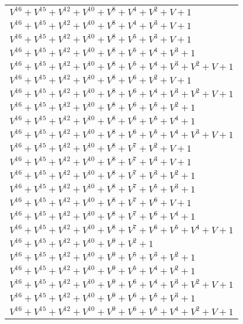 \documentclass[12pt]{article}
\begin{document}
\begin{adjustwidth}{-4cm}{}
\begin{center}
\begin{longtable}{|l|}
$V^{16}  +V^{15}  +V^{12}  +V^{10}  +V^{8}  +V^{4}  +V^{2}  + V + 1$ \\
$V^{16}  +V^{15}  +V^{12}  +V^{10}  +V^{8}  +V^{4}  +V^{3}  + V + 1$ \\
$V^{16}  +V^{15}  +V^{12}  +V^{10}  +V^{8}  +V^{5}  +V^{3}  + V + 1$ \\
$V^{16}  +V^{15}  +V^{12}  +V^{10}  +V^{8}  +V^{5}  +V^{4}  +V^{3}  + 1$ \\
$V^{16}  +V^{15}  +V^{12}  +V^{10}  +V^{8}  +V^{5}  +V^{4}  +V^{3}  +V^{2}  + V + 1$ \\
$V^{16}  +V^{15}  +V^{12}  +V^{10}  +V^{8}  +V^{6}  +V^{2}  + V + 1$ \\
$V^{16}  +V^{15}  +V^{12}  +V^{10}  +V^{8}  +V^{6}  +V^{4}  +V^{3}  +V^{2}  + V + 1$ \\
$V^{16}  +V^{15}  +V^{12}  +V^{10}  +V^{8}  +V^{6}  +V^{5}  +V^{2}  + 1$ \\
$V^{16}  +V^{15}  +V^{12}  +V^{10}  +V^{8}  +V^{6}  +V^{5}  +V^{4}  + 1$ \\
$V^{16}  +V^{15}  +V^{12}  +V^{10}  +V^{8}  +V^{6}  +V^{5}  +V^{4}  +V^{3}  + V + 1$ \\
$V^{16}  +V^{15}  +V^{12}  +V^{10}  +V^{8}  +V^{7}  +V^{2}  + V + 1$ \\
$V^{16}  +V^{15}  +V^{12}  +V^{10}  +V^{8}  +V^{7}  +V^{3}  + V + 1$ \\
$V^{16}  +V^{15}  +V^{12}  +V^{10}  +V^{8}  +V^{7}  +V^{3}  +V^{2}  + 1$ \\
$V^{16}  +V^{15}  +V^{12}  +V^{10}  +V^{8}  +V^{7}  +V^{5}  +V^{3}  + 1$ \\
$V^{16}  +V^{15}  +V^{12}  +V^{10}  +V^{8}  +V^{7}  +V^{6}  + V + 1$ \\
$V^{16}  +V^{15}  +V^{12}  +V^{10}  +V^{8}  +V^{7}  +V^{6}  +V^{4}  + 1$ \\
$V^{16}  +V^{15}  +V^{12}  +V^{10}  +V^{8}  +V^{7}  +V^{6}  +V^{5}  +V^{4}  + V + 1$ \\
$V^{16}  +V^{15}  +V^{12}  +V^{10}  +V^{9}  +V^{2}  + 1$ \\
$V^{16}  +V^{15}  +V^{12}  +V^{10}  +V^{9}  +V^{5}  +V^{3}  +V^{2}  + 1$ \\
$V^{16}  +V^{15}  +V^{12}  +V^{10}  +V^{9}  +V^{5}  +V^{4}  +V^{2}  + 1$ \\
$V^{16}  +V^{15}  +V^{12}  +V^{10}  +V^{9}  +V^{6}  +V^{4}  +V^{3}  +V^{2}  + V + 1$ \\
$V^{16}  +V^{15}  +V^{12}  +V^{10}  +V^{9}  +V^{6}  +V^{5}  +V^{3}  + 1$ \\
$V^{16}  +V^{15}  +V^{12}  +V^{10}  +V^{9}  +V^{6}  +V^{5}  +V^{4}  +V^{2}  + V + 1$ \\

\end{longtable}
\end{center}
\end{adjustwidth}
\end{document}
